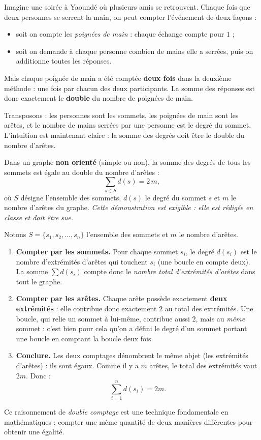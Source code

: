 \documentclass[11pt]{article}
\newcommand{\cle}[1]{{\popxbold\color{popdark}#1}}
\newcounter{popsec}
\newcounter{popsub}
\newcommand{\courssub}[1]{%
  \stepcounter{popsub}%
  \par\vspace{9pt}\noindent{\popxbold\fontsize{11.5}{13}\selectfont\color{popink}{\color{poporange}\thepopsec.\thepopsub}\hspace{6pt}#1}\par\nopagebreak\vspace{4pt}
}
\begin{document}
\courssub{Intuition : pourquoi compter deux fois ?}

Imagine une soirée à Yaoundé où plusieurs amis se retrouvent. Chaque fois que deux personnes se serrent la main, on peut compter l'événement de deux façons :
\begin{itemize}
\item soit on compte les \emph{poignées de main} : chaque échange compte pour $1$ ;
\item soit on demande à chaque personne combien de mains elle a serrées, puis on additionne toutes les réponses.
\end{itemize}
Mais chaque poignée de main a été comptée \textbf{deux fois} dans la deuxième méthode : une fois par chacun des deux participants. La somme des réponses est donc exactement le \textbf{double} du nombre de poignées de main.

Transposons : les personnes sont les \cle{sommets}, les poignées de main sont les \cle{arêtes}, et le nombre de mains serrées par une personne est le \cle{degré} du sommet. L'intuition est maintenant claire : la somme des degrés doit être le double du nombre d'arêtes.

\begin{propriete}
Dans un graphe \textbf{non orienté} (simple ou non), la somme des degrés de tous les sommets est égale au double du nombre d'arêtes :
\[ \sum_{s \in S} d(s) = 2\,m, \]
où $S$ désigne l'ensemble des sommets, $d(s)$ le degré du sommet $s$ et $m$ le nombre d'arêtes du graphe.
\emph{Cette démonstration est exigible : elle est rédigée en classe et doit être sue.}
\end{propriete}

\begin{experience}
Notons $S = \{s_1, s_2, \ldots, s_n\}$ l'ensemble des sommets et $m$ le nombre d'arêtes.
\begin{enumerate}
\item \textbf{Compter par les sommets.} Pour chaque sommet $s_i$, le degré $d(s_i)$ est le nombre d'extrémités d'arêtes qui touchent $s_i$ (une boucle en compte deux). La somme $\sum d(s_i)$ compte donc le \emph{nombre total d'extrémités d'arêtes} dans tout le graphe.
\item \textbf{Compter par les arêtes.} Chaque arête possède exactement \textbf{deux extrémités} : elle contribue donc exactement $2$ au total des extrémités. Une boucle, qui relie un sommet à lui-même, contribue aussi $2$, mais au \emph{même} sommet : c'est bien pour cela qu'on a défini le degré d'un sommet portant une boucle en comptant la boucle deux fois.
\item \textbf{Conclure.} Les deux comptages dénombrent le même objet (les extrémités d'arêtes) : ils sont égaux. Comme il y a $m$ arêtes, le total des extrémités vaut $2m$. Donc :
\[ \sum_{i=1}^{n} d(s_i) = 2m. \]
\end{enumerate}
Ce raisonnement de \emph{double comptage} est une technique fondamentale en mathématiques : compter une même quantité de deux manières différentes pour obtenir une égalité.
\end{experience}
\end{document}
